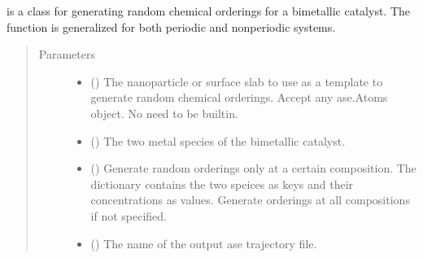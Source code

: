 \documentclass[letterpaper,10pt,english]{sphinxmanual}
\begin{document}
\begin{fulllineitems}
\label{\detokenize{build:acat.build.orderings.RandomOrderingGenerator}}
 is a class for generating random
chemical orderings for a bimetallic catalyst. The function is
generalized for both periodic and non\sphinxhyphen{}periodic systems.
\begin{quote}\begin{description}
\item[{Parameters}] \leavevmode\begin{itemize}
\item {} 
 () \textendash{} The nanoparticle or surface slab to use as a template to
generate random chemical orderings. Accept any ase.Atoms
object. No need to be built\sphinxhyphen{}in.

\item {} 
 () \textendash{} The two metal species of the bimetallic catalyst.

\item {} 
 (\sphinxstyleliteralemphasis{\sphinxupquote{, }}) \textendash{} Generate random orderings only at a certain composition.
The dictionary contains the two speices as keys and their
concentrations as values. Generate orderings at all
compositions if not specified.

\item {} 
 (\sphinxstyleliteralemphasis{\sphinxupquote{, }}) \textendash{} The name of the output ase trajectory file.


\end{itemize}
\end{description}
\end{quote}
\end{fulllineitems}
\end{document}
